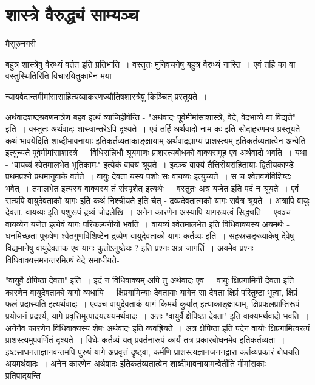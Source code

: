{\fontsize{15}{17}\selectfont
\presetvalues
\chapter{शास्त्रे वैरुद्ध्यं साम्यञ्च} 

\begin{center}
\smallskip

मैसूरुनगरी
\addrule
\end{center}

बहुत्र शास्त्रेषु वैरुध्यं वर्तत इति प्रतिभाति~। वस्तुतः मुनिवचनेषु बहुत्र वैरुध्यं नास्ति~। एवं तर्हि का वा वस्तुस्थितिरिति विचारयितुकामेन मया  

न्यायवेदान्तमीमांसासाहित्यव्याकरणज्यौतिषशास्त्रेषु किञ्चित् प्रस्तूयते~। 

अर्थवादशब्दश्रवणमात्रेण बहव इत्थं व्याजिहीर्षन्ति - "अर्थवादः पूर्वमीमांसाशास्त्रे, वेदे, वेदभाष्ये वा विद्यते" इति~। वस्तुतः अर्थवादः शास्त्रान्तरेऽपि दृश्यते~। एवं तर्हि अर्थवादो नाम कः इति सोदाहरणमत्र प्रस्तूयते~। कथं भावयेदिति शाब्दीभावनायाः इतिकर्तव्यताकाङ्क्षायाम् अर्थवादज्ञाप्यं प्राशस्त्यम् इतिकर्तव्यतात्वेन अन्वेति इत्युच्यते पूर्वमीमांसाशास्त्रे~। विधिसन्निधौ श्रूयमाणः प्राशस्त्यबोधको वाक्यसमूह एव अर्थवादो भवति~। यथा - "वायव्यं श्वेतमालभेत भूतिकामः" इत्येकं वाक्यं श्रूयते~। इदञ्च वाक्यं तैत्तिरीयसंहितायाः द्वितीयकाण्डे प्रथमप्रश्ने प्रथमानुवाके वर्तते~। वायुः देवता यस्य पशोः सः वायव्यः इत्युच्यते~। स च श्वेतवर्णविशिष्टः भवेत्~। तमालभेत इत्यस्य वाक्यस्य तं संस्पृशेत् इत्यर्थः~। वस्तुतः अत्र यजेत इति पदं न श्रूयते~। एवं सत्यपि वायुदेवताको यागः इति कथं निश्चीयते इति चेत् - द्रव्यदेवतात्मको यागः सर्वत्र श्रूयते~। अत्रापि वायुः देवता, वायव्यः इति पशुरूपं द्रव्यं चोदलेखि~। अनेन कारणेन अस्यापि यागरूपत्वं सिद्ध्यति~। एवञ्च वायव्येन यजेत इत्येवं यागः परिकल्पनीयो भवति~। वायव्यं श्वेतमालभेत इति विधिवाक्यस्य अयमर्थः - धनमिच्छता पुरुषेण श्वेतगुणविशिष्टेन द्रव्येण वायुदेवताको यागः कर्तव्यः इति~। सहस्रसङ्ख्याकेषु देवेषु विद्यमानेषु वायुदेवताक एव यागः कुतोऽनुष्ठेयः ? इति प्रश्नः अत्र जागर्ति~। अयमेव प्रश्नः विधिवाक्यसमनन्तरमित्थं वेदे समाधीयते-

"वायुर्वै क्षेपिष्ठा देवता" इति~। इदं न विधिवाक्यम् अपि तु अर्थवादः एव~। वायुः क्षिप्रगामिनी देवता इति कारणेन वायुदेवताको यागो व्यधायि~। क्षिप्रगामिन्याः देवतायाः यागेन सा देवता क्षिप्रं परितुष्टा भूत्वा, क्षिप्रं फलं प्रदास्यति इत्यर्थवादः~। एवञ्च वायुदेवताकं यागं किमर्थं कुर्यात् इत्याकाङ्क्षायाम्, क्षिप्रफलप्राप्तिरूपं प्रयोजनं प्रदर्श्य, यागे प्रवृत्तिमुत्पादयत्ययमर्थवादः~। अतः "वायुर्वै क्षेपिष्ठा देवता" इति वाक्यमर्थवादो भवति~। अनेनैव कारणेन  विधिवाक्यस्य शेषः अर्थवादः इति व्यवह्रियते~। अत्र क्षेपिष्ठा इति पदेन वायोः क्षिप्रगामित्वरूपं प्राशस्त्यमुपवर्णितं दृश्यते~। विधेः कर्तव्यं यत् प्रवर्तनारूपं कार्यं तत्र प्रकारबोधनमेव इतिकर्तव्यता~। इष्टसाधनताज्ञानवन्तमपि पुरुषं यागे अप्रवृत्तं दृष्ट्वा, कर्मणि प्राशस्त्यज्ञानजननद्वारा कर्तव्यप्रकारं बोधयति अयमर्थवादः~। अनेन कारणेन अर्थवादः इतिकर्तव्यतात्वेन शाब्दीभावनायामन्वेतीति मीमांसकाः प्रतिपादयन्ति~। 

}
